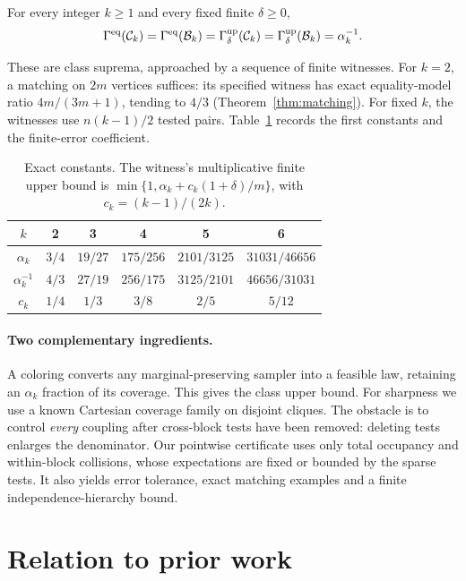 \begin{theorem}\label{thm:main}
For every integer \(k\geq1\) and every fixed finite \(\delta\geq0\),
\[
 \Gamma^{\mathrm{eq}}(\mathcal C_k)=\Gamma^{\mathrm{eq}}(\mathcal B_k)
 =\Gamma_\delta^{\mathrm{up}}(\mathcal C_k)=\Gamma_\delta^{\mathrm{up}}(\mathcal B_k)=\alpha_k^{-1}.
\]
\end{theorem}

These are class suprema, approached by a sequence of finite witnesses.
For \(k=2\), a matching on \(2m\) vertices suffices: its specified witness
has exact equality-model ratio \(4m/(3m+1)\), tending to \(4/3\)
(Theorem~\ref{thm:matching}). For fixed \(k\), the witnesses use
\(n(k-1)/2\) tested pairs. Table~\ref{tab:constants} records the first
constants and the finite-error coefficient.

\begin{table}[!hbp]
\centering
\caption{Exact constants. The witness's multiplicative finite upper bound is
\(\min\{1,\alpha_k+c_k(1+\delta)/m\}\), with \(c_k=(k-1)/(2k)\).}
\label{tab:constants}
\begin{tabular}{c|ccccc}
\toprule
\(k\)&2&3&4&5&6\\
\midrule
\(\alpha_k\)&\(3/4\)&\(19/27\)&\(175/256\)&\(2101/3125\)&\(31031/46656\)\\
\(\alpha_k^{-1}\)&\(4/3\)&\(27/19\)&\(256/175\)&\(3125/2101\)&\(46656/31031\)\\
\(c_k\)&\(1/4\)&\(1/3\)&\(3/8\)&\(2/5\)&\(5/12\)\\
\bottomrule
\end{tabular}
\end{table}

\paragraph{Two complementary ingredients.}
A coloring converts any marginal-preserving sampler into a feasible law,
retaining an \(\alpha_k\) fraction of its coverage. This gives the class
upper bound. For sharpness we use a known Cartesian coverage family on
disjoint cliques. The obstacle is to control \emph{every} coupling after
cross-block tests have been removed: deleting tests enlarges the denominator.
Our pointwise certificate uses only total occupancy and within-block
collisions, whose expectations are fixed or bounded by the sparse tests.
It also yields error tolerance, exact matching examples and a finite
independence-hierarchy bound.

\section{Relation to prior work}\label{sec:related}

